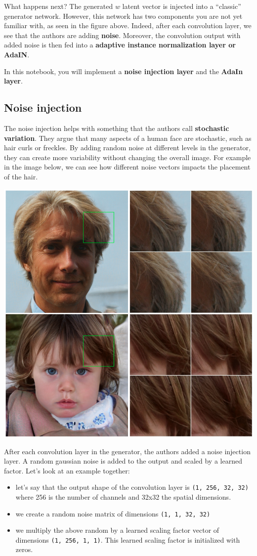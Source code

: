 What happens next? The generated \(w\) latent vector is injected into a
``classic'' generator network. However, this network has two components
you are not yet familiar with, as seen in the figure above. Indeed,
after each convolution layer, we see that the authors are adding
\textbf{noise}. Moreover, the convolution output with added noise is
then fed into a \textbf{adaptive instance normalization layer or AdaIN}.  \newline

In this notebook, you will implement a \textbf{noise injection layer}
and the \textbf{AdaIn layer}.

\subsection{Noise injection}
The noise injection helps with something that the authors call
\textbf{stochastic variation}. They argue that many aspects of a human
face are stochastic, such as hair curls or freckles. By adding random
noise at different levels in the generator, they can create more
variability without changing the overall image. For example in the image
below, we can see how different noise vectors impacts the placement of
the hair.

\includegraphics[width=0.5\linewidth]{img//genAdvNet//modernGAN/stochastic_variation.png}

After each convolution layer in the generator, the authors added a noise
injection layer. A random gaussian noise is added to the output and
scaled by a learned factor. Let's look at an example together: 
\begin{itemize}
    \item let's say that the output shape of the convolution layer is \lstinline{(1, 256, 32, 32)} where 256 is the number of channels and 32x32 the spatial dimensions.
    \item we create a random noise matrix of dimensions \lstinline{(1, 1, 32, 32)}
    \item we multiply the above random by a learned scaling factor vector of dimensions \lstinline{(1, 256, 1, 1)}. This learned scaling factor is initialized with zeros.
\end{itemize}

